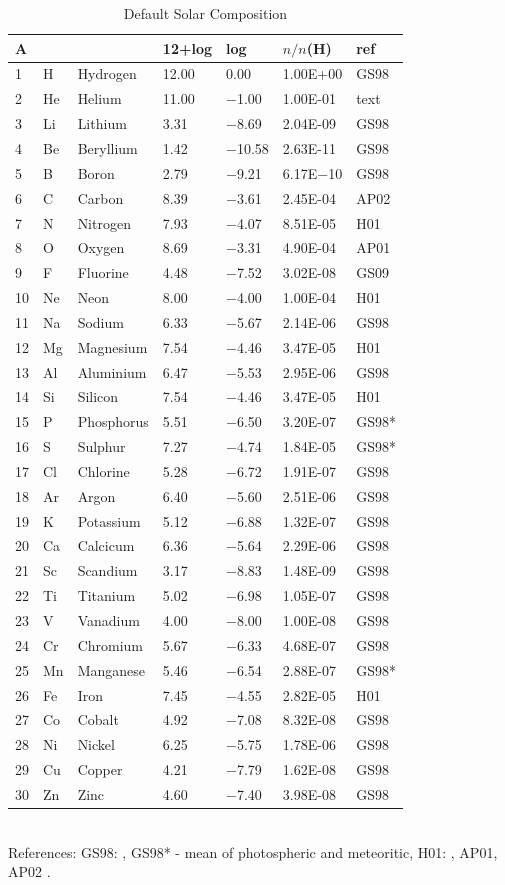 \begin{table}
\centering
\caption{Default Solar Composition}
\label{tab:CompositionSolar}
\begin{tabular}{lllllll}
\hline
A&&&12+log& log& $n/n$(H)& ref\\
\hline
1& H& Hydrogen& 12.00& 0.00& 1.00E+00& GS98\\
2& He& Helium& 11.00& $-$1.00& 1.00E-01& text\\
3& Li& Lithium& 3.31& $-$8.69& 2.04E-09& GS98\\
4& Be& Beryllium& 1.42& $-$10.58& 2.63E-11& GS98\\
5& B& Boron& 2.79& $-$9.21& 6.17E$-$10& GS98\\
\hline
6& C& Carbon& 8.39& $-$3.61& 2.45E-04& AP02\\
7& N& Nitrogen& 7.93& $-$4.07& 8.51E-05& H01\\
8& O& Oxygen& 8.69& $-$3.31& 4.90E-04& AP01\\
9& F& Fluorine& 4.48& $-$7.52& 3.02E-08& GS09\\
10& Ne& Neon& 8.00& $-$4.00& 1.00E-04& H01\\
\hline
11& Na& Sodium& 6.33& $-$5.67& 2.14E-06& GS98\\
12& Mg& Magnesium& 7.54& $-$4.46& 3.47E-05& H01\\
13& Al& Aluminium& 6.47& $-$5.53& 2.95E-06& GS98\\
14& Si& Silicon& 7.54& $-$4.46& 3.47E-05& H01\\
15& P& Phosphorus& 5.51& $-$6.50& 3.20E-07& GS98*\\
\hline
16& S& Sulphur& 7.27& $-$4.74& 1.84E-05& GS98*\\
17& Cl& Chlorine& 5.28& $-$6.72& 1.91E-07& GS98\\
18& Ar& Argon& 6.40& $-$5.60& 2.51E-06& GS98\\
19& K& Potassium& 5.12& $-$6.88& 1.32E-07& GS98\\
20& Ca& Calcicum& 6.36& $-$5.64& 2.29E-06& GS98\\
\hline
21& Sc& Scandium& 3.17& $-$8.83& 1.48E-09& GS98\\
22& Ti& Titanium& 5.02& $-$6.98& 1.05E-07& GS98\\
23& V& Vanadium& 4.00& $-$8.00& 1.00E-08& GS98\\
24& Cr& Chromium& 5.67& $-$6.33& 4.68E-07& GS98\\
25& Mn& Manganese& 5.46& $-$6.54& 2.88E-07& GS98*\\
\hline
26& Fe& Iron& 7.45& $-$4.55& 2.82E-05& H01\\
27& Co& Cobalt& 4.92& $-$7.08& 8.32E-08& GS98\\
28& Ni& Nickel& 6.25& $-$5.75& 1.78E-06& GS98\\
29& Cu& Copper& 4.21& $-$7.79& 1.62E-08& GS98\\
30& Zn& Zinc& 4.60& $-$7.40& 3.98E-08& GS98\\
\hline
\end{tabular}\\[0.5pc]
References: GS98: \citet{Grevesse1998}, GS98* - mean of photospheric
and meteoritic, H01: \citet{Holweger2001}, AP01, AP02
\citet{Allende2001,Allende2002}.
\end{table}

